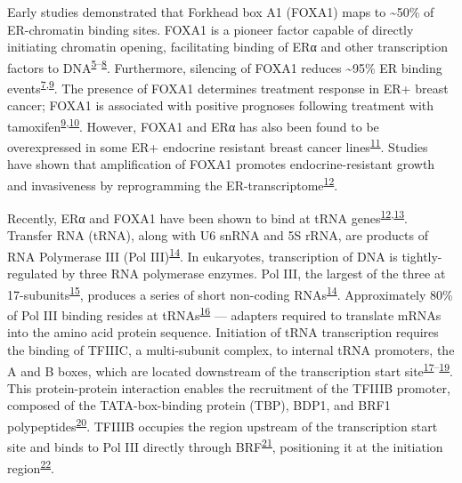 \documentclass[
  12pt,
]{article}
\begin{document}
Early studies demonstrated that Forkhead box A1 (FOXA1) maps to \textasciitilde50\% of ER-chromatin binding sites.
FOXA1 is a pioneer factor capable of directly initiating chromatin opening, facilitating binding of ERα and other transcription factors to DNA\textsuperscript{\protect\hyperlink{ref-Costa1989}{5}--\protect\hyperlink{ref-laganiuxe8re2005}{8}}.
Furthermore, silencing of FOXA1 reduces \textasciitilde95\% ER binding events\textsuperscript{\protect\hyperlink{ref-carroll2005}{7},\protect\hyperlink{ref-Hurtado2011}{9}}.
The presence of FOXA1 determines treatment response in ER+ breast cancer; FOXA1 is associated with positive prognoses following treatment with tamoxifen\textsuperscript{\protect\hyperlink{ref-Hurtado2011}{9},\protect\hyperlink{ref-Badve2007}{10}}.
However, FOXA1 and ERα has also been found to be overexpressed in some ER+ endocrine resistant breast cancer lines\textsuperscript{\protect\hyperlink{ref-ross-innes2012}{11}}.
Studies have shown that amplification of FOXA1 promotes endocrine-resistant growth and invasiveness by reprogramming the ER-transcriptome\textsuperscript{\protect\hyperlink{ref-fu2016}{12}}.

Recently, ERα and FOXA1 have been shown to bind at tRNA genes\textsuperscript{\protect\hyperlink{ref-fu2016}{12},\protect\hyperlink{ref-malcolm2022}{13}}.
Transfer RNA (tRNA), along with U6 snRNA and 5S rRNA, are products of RNA Polymerase III (Pol III)\textsuperscript{\protect\hyperlink{ref-dieci2007}{14}}.
In eukaryotes, transcription of DNA is tightly-regulated by three RNA polymerase enzymes.
Pol III, the largest of the three at 17-subunits\textsuperscript{\protect\hyperlink{ref-vannini2012}{15}}, produces a series of short non-coding RNAs\textsuperscript{\protect\hyperlink{ref-dieci2007}{14}}.
Approximately 80\% of Pol III binding resides at tRNAs\textsuperscript{\protect\hyperlink{ref-Raha2010a}{16}} --- adapters required to translate mRNAs into the amino acid protein sequence.
Initiation of tRNA transcription requires the binding of TFIIIC, a multi-subunit complex, to internal tRNA promoters, the A and B boxes, which are located downstream of the transcription start site\textsuperscript{\protect\hyperlink{ref-Schramm2002}{17}--\protect\hyperlink{ref-Galli1981}{19}}.
This protein-protein interaction enables the recruitment of the TFIIIB promoter, composed of the TATA-box-binding protein (TBP), BDP1, and BRF1 polypeptides\textsuperscript{\protect\hyperlink{ref-schramm2000}{20}}.
TFIIIB occupies the region upstream of the transcription start site and binds to Pol III directly through BRF\textsuperscript{\protect\hyperlink{ref-Khoo1994}{21}}, positioning it at the initiation region\textsuperscript{\protect\hyperlink{ref-kassavetis1990}{22}}.
\end{document}
